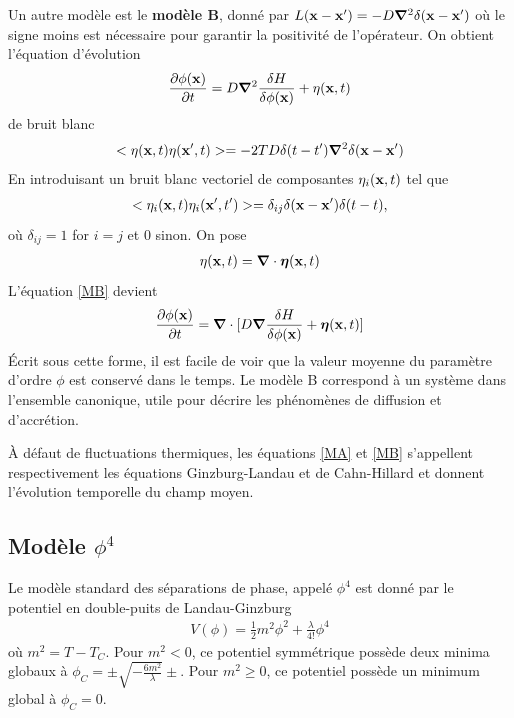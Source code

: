 Un autre modèle est le \textbf{modèle B}, donné par $L({\bf x}-{\bf x}')= -D{\boldsymbol \nabla}^2 \delta({\bf x}-{\bf x'})$ où le signe moins est nécessaire pour garantir la positivité de l'opérateur. On obtient l'équation d'évolution
\begin{align}
    \frac{\partial \phi({\bf x})}{\partial t}= D{\boldsymbol \nabla}^2 \frac{\delta H}{\delta \phi({\bf x})} + \eta({\bf x},t)
    \label{MB}
\end{align}
de bruit blanc
\begin{align}
    <\eta({\bf x},t)\eta({\bf x}',t)> =-2TD   \delta(t-t'){\boldsymbol \nabla}^2\delta({\bf x}-{\bf x}')
\end{align}
En introduisant un bruit blanc vectoriel de composantes $\eta_i({\bf x},t)$ tel que 
\begin{align}
    < \eta_i({\bf x},t) \eta_i({\bf x}',t')> =\delta_{ij} \delta({\bf x}-{\bf x}')\delta(t-t),
\end{align}
où $\delta_{ij}=1$ for $i=j$ et $0$ sinon. On pose 
\begin{align}
    \eta({\bf x},t)= {\boldsymbol \nabla}\cdot {\boldsymbol \eta}({\bf x},t)
\end{align}
L'équation \ref{MB} devient 
\begin{align}
    \frac{\partial \phi({\bf x})}{\partial t}= {\boldsymbol \nabla}\cdot[ D{\boldsymbol \nabla} \frac{\delta H}{\delta \phi({\bf x})} + {\boldsymbol\eta}({\bf x},t)]
\end{align}
Écrit sous cette forme, il est facile de voir que la valeur moyenne du paramètre d'ordre $\phi$ est conservé dans le temps. Le modèle B correspond à un système dans l'ensemble canonique, utile pour décrire les phénomènes de diffusion et d'accrétion.

À défaut de fluctuations thermiques, les équations \ref{MA} et \ref{MB} s'appellent respectivement les équations Ginzburg-Landau et de Cahn-Hillard \cite{cahn_free_nodate,langer_new_1975,kawasaki_growth_1978} et donnent l'évolution temporelle du champ moyen. 

    \subsection{Modèle $\phi^4$}
    
Le modèle standard des séparations de phase, appelé $\phi^4$ est donné par le potentiel en double-puits de Landau-Ginzburg \cite[§ 45]{l_landau_physique_1990} 
\begin{align}
    V(\phi) = \frac{1}{2} m^2 \phi^2 + \frac{\lambda}{4!} \phi^4
    \label{phi4}
\end{align} 
où $m^2 = T-T_C$. Pour $m^2 \less 0$, ce potentiel symmétrique possède deux minima globaux à $\phi_C = \pm \sqrt{- \frac{6 m^2}{\lambda} } \pm$. Pour $m^2 \ge 0$, ce potentiel possède un minimum global à $\phi_C = 0$. 

